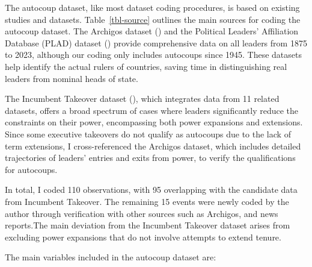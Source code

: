 \documentclass[
  12pt,
]{report}
\begin{document}
\endgroup

The autocoup dataset, like most dataset coding procedures, is based on
existing studies and datasets. Table~\ref{tbl-source} outlines the main
sources for coding the autocoup dataset. The Archigos dataset
() and
the Political Leaders' Affiliation Database (PLAD) dataset
() provide
comprehensive data on all leaders from 1875 to 2023, although our coding
only includes autocoups since 1945. These datasets help identify the
actual rulers of countries, saving time in distinguishing real leaders
from nominal heads of state.

The Incumbent Takeover dataset (), which integrates data from 11 related datasets, offers
a broad spectrum of cases where leaders significantly reduce the
constraints on their power, encompassing both power expansions and
extensions. Since some executive takeovers do not qualify as autocoups
due to the lack of term extensions, I cross-referenced the Archigos
dataset, which includes detailed trajectories of leaders' entries and
exits from power, to verify the qualifications for autocoups.

In total, I coded 110 observations, with 95 overlapping with the
candidate data from Incumbent Takeover. The remaining 15 events were
newly coded by the author through verification with other sources such
as Archigos, and news reports.The main deviation from the Incumbent
Takeover dataset arises from excluding power expansions that do not
involve attempts to extend tenure.

The main variables included in the autocoup dataset are:
\end{document}
